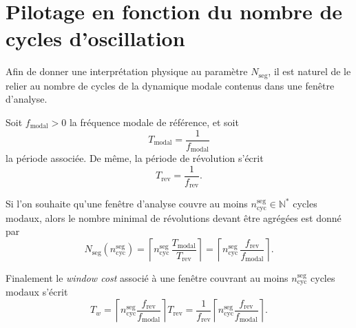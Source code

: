 \documentclass[12pt,a4paper, openany]{book}
\begin{document}
\section{Pilotage en fonction du nombre de cycles d'oscillation}

Afin de donner une interprétation physique au paramètre $N_{\mathrm{seg}}$, il est naturel de le relier au nombre de cycles de la dynamique modale contenus dans une fenêtre d'analyse.

Soit $f_{\mathrm{modal}} > 0$ la fréquence modale de référence, et soit
\begin{equation}
T_{\mathrm{modal}} = \frac{1}{f_{\mathrm{modal}}}
\end{equation}
la période associée. De même, la période de révolution s'écrit
\begin{equation}
T_{\mathrm{rev}} = \frac{1}{f_{\mathrm{rev}}}.
\end{equation}

Si l'on souhaite qu'une fenêtre d'analyse couvre au moins $n_{\mathrm{cyc}}^{\mathrm{seg}} \in \mathbb{N}^{*}$ cycles modaux, alors le nombre minimal de révolutions devant être agrégées est donné par
\begin{equation}
N_{\mathrm{seg}}\!\left(n_{\mathrm{cyc}}^{\mathrm{seg}}\right)
=
\left\lceil
n_{\mathrm{cyc}}^{\mathrm{seg}} \,\frac{T_{\mathrm{modal}}}{T_{\mathrm{rev}}}
\right\rceil
=
\left\lceil
n_{\mathrm{cyc}}^{\mathrm{seg}} \,\frac{f_{\mathrm{rev}}}{f_{\mathrm{modal}}}
\right\rceil.
\label{eq:nseg_modal}
\end{equation}

Finalement le \textit{window cost} associé à une fenêtre couvrant au moins $n_{\mathrm{cyc}}^{\mathrm{seg}}$ cycles modaux s'écrit
\begin{equation}
T_w
=
\left\lceil
n_{\mathrm{cyc}}^{\mathrm{seg}}
\frac{f_{\mathrm{rev}}}{f_{\mathrm{modal}}}
\right\rceil
T_{\mathrm{rev}}
=
\frac{1}{f_{\mathrm{rev}}}
\left\lceil
n_{\mathrm{cyc}}^{\mathrm{seg}}
\frac{f_{\mathrm{rev}}}{f_{\mathrm{modal}}}
\right\rceil.
\end{equation}


\end{document}
